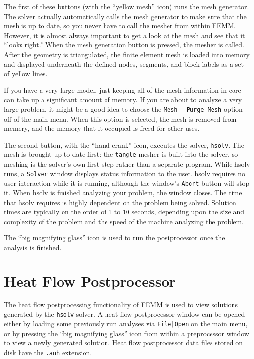 The first of these buttons (with the ``yellow mesh'' icon) runs the
mesh generator. The solver actually automatically calls the mesh
generator to make sure that the mesh is up to date, so you never
have to call the mesher from within FEMM. However, it is almost
always important to get a look at the mesh and see that it ``looks
right.'' When the mesh generation button is pressed, the mesher is
called. After the geometry is
triangulated, the finite element mesh is loaded into memory and
displayed underneath the defined nodes, segments, and block labels
as a set of yellow lines.

If you have a very large model, just keeping all of the mesh
information in core can take up a significant amount of memory. If
you are about to analyze a very large problem, it might be a good
idea to choose the \texttt{Mesh $\vert $ Purge Mesh} option off of
the main menu. When this option is selected, the mesh is removed
from memory, and the memory that it occupied is freed for other
uses.

The second button, with the ``hand-crank'' icon, executes the solver,
\texttt{hsolv}. The mesh is brought up to date first: the
\texttt{tangle} mesher is built into the solver, so meshing is the solver's
own first step rather than a separate program. While
hsolv runs, a \texttt{Solver} window displays status information
to the user. hsolv requires no user interaction while it is
running, although the window's \texttt{Abort} button will stop it. When
hsolv is finished analyzing your problem, the window
closes. The time that hsolv requires is highly dependent
on the problem being solved. Solution times are typically on the order of 1
to 10 seconds, depending upon the size and complexity of the problem and the
speed of the machine analyzing the problem.

The ``big magnifying glass'' icon is used to run the postprocessor once the
analysis is finished.



\section{Heat Flow Postprocessor}

The heat flow postprocessing functionality of FEMM is
used to view solutions generated by the {\tt hsolv} solver.  A heat flow
postprocessor window can be opened either by loading
some previously run analyses via {\tt File|Open} on the main menu,
or by pressing the ``big magnifying glass'' icon from within a
preprocessor window to view a newly generated solution.
Heat flow postprocessor data files stored on disk have the
{\tt .anh} extension.


